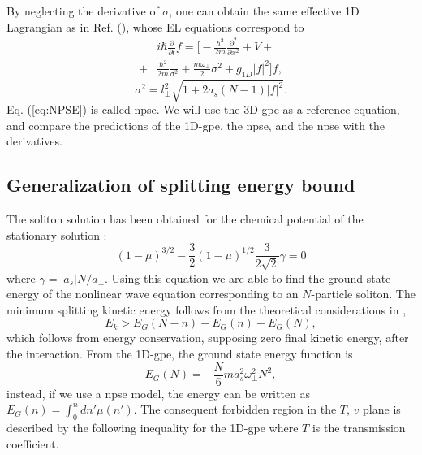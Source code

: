 \documentclass[pra,twocolumn]{revtex4-2}
\begin{document}
  By neglecting the derivative of $\sigma$, one can obtain the same effective 1D Lagrangian as in Ref. (\cite{salasnich_bose-einstein_2022}), whose EL equations correspond to
  \begin{equation}\label{eq:NPSE}
      \begin{split}
      &i \hbar \frac{\partial}{\partial t} f = \bigg[- \frac{\hbar^2}{2 m} \frac{\partial^2}{\partial x^2} + V +\\+ &\frac{\hbar^2}{2m} \frac{1}{\sigma^2} + \frac{m\omega_\perp}{2}\sigma^2 + g_{1D}|f|^2 \bigg]f,
      \end{split}
  \end{equation}
  \begin{equation}\label{eq:NPSEsigma}
      \sigma^2 = l_\perp^2\sqrt{1+ 2a_s(N-1)|f|^2}.
  \end{equation}
  Eq. (\ref{eq:NPSE}) is called \gls{npse}.
  We will use the 3D-\gls{gpe} as a reference equation, and compare the predictions of the 1D-\gls{gpe}, the \gls{npse}, and the \gls{npse} with the derivatives.


  \subsection{Generalization of splitting energy bound}
  The soliton solution has been obtained for the chemical potential of the stationary solution \cite{salasnich_effective_2002}:
  \begin{equation}
    (1-\mu)^{3/2} - \dfrac{3}{2}(1-\mu)^{1/2} \dfrac{3}{2\sqrt{2}} \gamma= 0
  \end{equation}
  where $\gamma=|a_s|N/a_{\perp}$. Using this equation we are able to find the ground state energy of the nonlinear wave equation corresponding to an $N$-particle soliton.
  The minimum splitting kinetic energy follows from the theoretical considerations in \cite{helm_splitting_2014, wang_particle-wave_2012, gertjerenken_scattering_2012},
  \begin{equation}
      E_k > E_G\left(N-n\right) + E_G\left(n\right) - E_G(N),
  \end{equation}
  which follows from energy conservation, supposing zero final kinetic energy, after the interaction.
  From the 1D-\gls{gpe}, the ground state energy function is 
  \begin{equation}
      E_G(N)= -\dfrac{N}{6} m a_s^2  \omega_\perp^2 N^2,
  \end{equation}
  instead, if we use a \gls{npse} model, the energy can be written as $E_G(n) = \int_0^n dn'\mu(n')$. 
  The consequent forbidden region in the $T$, $v$ plane is described by the following inequality for the 1D-\gls{gpe}
  where $T$ is the transmission coefficient.
\end{document}
